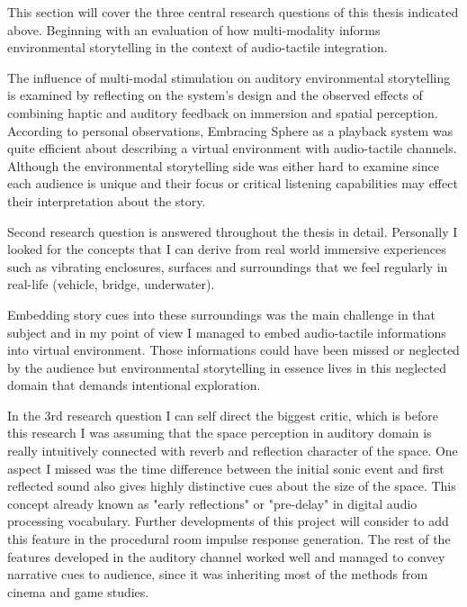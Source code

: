         This section will cover the three central research questions of this thesis indicated above. Beginning with an evaluation of how multi-modality informs environmental storytelling in the context of audio-tactile integration.\par

        The influence of multi-modal stimulation on auditory environmental storytelling is examined by reflecting on the system’s design and the observed effects of combining haptic and auditory feedback on immersion and spatial perception. According to personal observations, Embracing Sphere as a playback system was quite efficient about describing a virtual environment with audio-tactile channels. Although the environmental storytelling side was either hard to examine since each audience is unique and their focus or critical listening capabilities may effect their interpretation about the story.\par

        Second research question is answered throughout the thesis in detail. Personally I looked for the concepts that I can derive from real world immersive experiences such as vibrating enclosures, surfaces and surroundings that we feel regularly in real-life (vehicle, bridge, underwater).\par

        Embedding story cues into these surroundings was the main challenge in that subject and in my point of view I managed to embed audio-tactile informations into virtual environment. Those informations could have been missed or neglected by the audience but environmental storytelling in essence lives in this neglected domain that demands intentional exploration.\par

        In the 3rd research question I can self direct the biggest critic, which is before this research I was assuming that the space perception in auditory domain is really intuitively connected with reverb and reflection character of the space. One aspect I missed was the time difference between the initial sonic event and first reflected sound also gives highly distinctive cues about the size of the space. This concept already known as "early reflections" or "pre-delay" in digital audio processing vocabulary. Further developments of this project will consider to add this feature in the procedural room impulse response generation. The rest of the features developed in the auditory channel worked well and managed to convey narrative cues to audience, since it was inheriting most of the methods from cinema and game studies.\par

